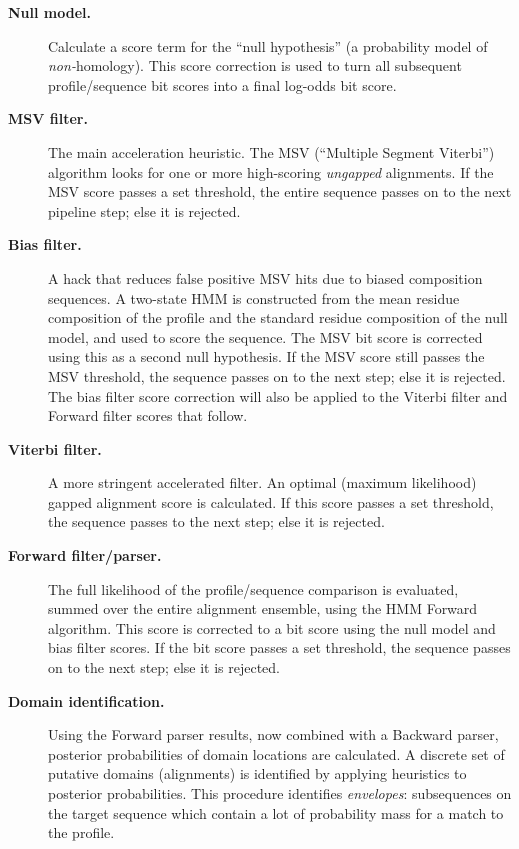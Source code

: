 \begin{description}
\item[\textbf{Null model.}] Calculate a score term for the ``null
  hypothesis'' (a probability model of \emph{non-}homology). This
  score correction is used to turn all subsequent profile/sequence bit
  scores into a final log-odds bit score.
  
\item[\textbf{MSV filter.}] The main acceleration heuristic. The MSV
  (``Multiple Segment Viterbi'') algorithm looks for one or more
  high-scoring \emph{ungapped} alignments. If the MSV score passes a
  set threshold, the entire sequence passes on to the next pipeline
  step; else it is rejected.

\item[\textbf{Bias filter.}] A hack that reduces false positive MSV
  hits due to biased composition sequences. A two-state HMM is
  constructed from the mean residue composition of the profile and the
  standard residue composition of the null model, and used to score
  the sequence. The MSV bit score is corrected using this as a second
  null hypothesis. If the MSV score still passes the MSV threshold,
  the sequence passes on to the next step; else it is rejected.  The
  bias filter score correction will also be applied to the Viterbi
  filter and Forward filter scores that follow.
  
\item[\textbf{Viterbi filter.}] A more stringent accelerated filter.
  An optimal (maximum likelihood) gapped alignment score is
  calculated. If this score passes a set threshold, the sequence
  passes to the next step; else it is rejected.

\item[\textbf{Forward filter/parser.}] The full likelihood of the
  profile/sequence comparison is evaluated, summed over the entire
  alignment ensemble, using the HMM Forward algorithm. This score is
  corrected to a bit score using the null model and bias filter
  scores. If the bit score passes a set threshold, the sequence passes
  on to the next step; else it is rejected.

\item[\textbf{Domain identification.}] Using the Forward parser
  results, now combined with a Backward parser, posterior
  probabilities of domain locations are calculated. A discrete set of
  putative domains (alignments) is identified by applying heuristics
  to posterior probabilities. This procedure identifies
  \emph{envelopes}: subsequences on the target sequence which contain
  a lot of probability mass for a match to the profile.


\end{description}

